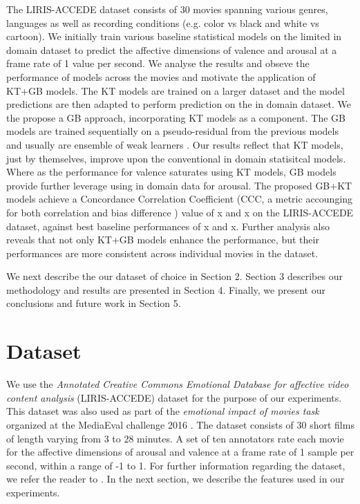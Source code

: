 \documentclass{article}
\begin{document}
The LIRIS-ACCEDE dataset consists of 30 movies spanning various genres, languages as well as recording conditions (e.g. color vs black and white vs cartoon).
We initially train various baseline statistical models on the limited in domain dataset to predict the affective dimensions of valence and arousal at a frame rate of 1 value per second.
We analyse the results and obseve the performance of models across the movies and motivate the application of KT+GB models.
The KT models are trained on a larger dataset and the model predictions are then adapted to perform prediction on the in domain dataset.
We the propose a GB approach, incorporating KT models as a component.
The GB models are trained sequentially on a pseudo-residual from the previous models and usually are ensemble of weak learners \cite{}. 
Our results reflect that KT models, just by themselves, improve upon the conventional in domain statisitcal models.
Where as the performance for valence saturates using KT models, GB models provide further leverage using in domain data for arousal.
The proposed GB+KT models achieve a Concordance Correlation Coefficient (CCC, a metric accounging for both correlation and bias difference \cite{}) value of x and x on the LIRIS-ACCEDE dataset, against best baseline performances of x and x.
Further analysis also reveals that not only KT+GB models enhance the performance, but their performances are more consistent across individual movies in the dataset.

We next describe the our dataset of choice in Section 2.
Section 3 describes our methodology and results are presented in Section 4. 
Finally, we present our conclusions and future work in Section 5.

\section{Dataset}

We use the {\it Annotated Creative Commons Emotional Database for affective video content analysis} (LIRIS-ACCEDE) dataset for the purpose of our experiments.
This dataset was also used as part of the {\it emotional impact of movies task} organized at the MediaEval challenge 2016 \cite{}.
The dataset consists of 30 short films of length varying from 3 to 28 minutes.
A set of ten annotators rate each movie for the affective dimensions of arousal and valence at a frame rate of 1 sample per second, within a range of -1 to 1. 
For further information regarding the dataset, we refer the reader to \cite{}.
In the next section, we describe the features used in our experiments.
\end{document}
